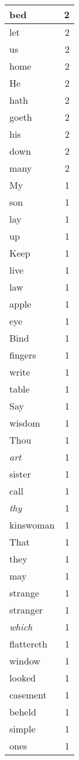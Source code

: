 \begin{center}
\begin{longtable}{l|r}
bed & 2\\ \hline 
let & 2\\ \hline 
us & 2\\ \hline 
home & 2\\ \hline 
He & 2\\ \hline 
hath & 2\\ \hline 
goeth & 2\\ \hline 
his & 2\\ \hline 
down & 2\\ \hline 
many & 2\\ \hline 
My & 1\\ \hline 
son & 1\\ \hline 
lay & 1\\ \hline 
up & 1\\ \hline 
Keep & 1\\ \hline 
live & 1\\ \hline 
law & 1\\ \hline 
apple & 1\\ \hline 
eye & 1\\ \hline 
Bind & 1\\ \hline 
fingers & 1\\ \hline 
write & 1\\ \hline 
table & 1\\ \hline 
Say & 1\\ \hline 
wisdom & 1\\ \hline 
Thou & 1\\ \hline 
\emph{art} & 1\\ \hline 
sister & 1\\ \hline 
call & 1\\ \hline 
\emph{thy} & 1\\ \hline 
kinswoman & 1\\ \hline 
That & 1\\ \hline 
they & 1\\ \hline 
may & 1\\ \hline 
strange & 1\\ \hline 
stranger & 1\\ \hline 
\emph{which} & 1\\ \hline 
flattereth & 1\\ \hline 
window & 1\\ \hline 
looked & 1\\ \hline 
casement & 1\\ \hline 
beheld & 1\\ \hline 
simple & 1\\ \hline 
ones & 1\\ \hline 

\end{longtable}
\end{center}
